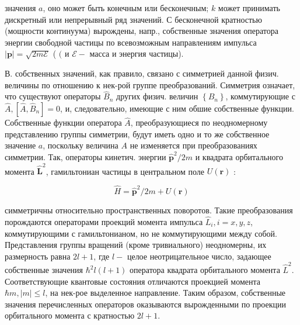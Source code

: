 \documentclass[10pt]{article}
\begin{document}
значения $a$, оно может быть конечным или бесконечным; $k$ может принимать дискретный или непрерывный ряд значений. С бесконечной кратностью (мощности континуума) вырождены, напр., собственные значения оператора энергии свободной частицы по всевозможным направлениям импульса $|\boldsymbol{p}|=\sqrt{2 m \mathscr{E}}$ ( $($ и $\mathscr{E}-$ масса и энергия частицы).



В. собственных значений, как правило, связано с симметрией данной физич. величины по отношению к нек-рой группе преобразований. Симметрия означает, что существуют операторы $\hat{B}_{n}$ других физич. величин $\left\{B_{n}\right\}$, коммутирующие с $\hat{A},\left[\hat{A}, \hat{B}_{n}\right]=0$, и, следовательно, имеющие с ним обшие собственные функции. Собственные функции оператора $\hat{A}$, преобразующиеся по неодномерному представлению группы симметрии, будут иметь одно и то же собственное значение $a$, поскольку величина $A$ не изменяется при преобразованиях симметрии. Так, операторы кинетич. энергии $\hat{\boldsymbol{p}}^{2} / 2 m$ и квадрата орбитального момента $\hat{\boldsymbol{L}}^{2}$, гамильтониан частицы в центральном поле $U(\boldsymbol{r})$ :



\[

\hat{H}=\hat{\boldsymbol{p}}^{2} / 2 m+U(\boldsymbol{r})

\]



симметричны относительно пространственных поворотов. Такие преобразования порождаются операторами проекций момента импульса $\hat{L}_{i}, i=x, y, z$, коммутирующими с гамильтонианом, но не коммутирующими между собой. Представления группы вращений (кроме тривиального) неодномерны, их размерность равна $2 l+1$, где $l-$ целое неотрицательное число, задающее собственные значения $\hbar^{2} l(l+1)$ оператора квадрата орбитального момента $\hat{L}^{2}$. Соответствующие квантовые состояния отличаются проекцией момента $\hbar m,|m| \leqslant l$, на нек-рое выделенное направление. Таким образом, собственные значения перечисленных операторов оказываются вырожденными по проекции орбитального момента с кратностью $2 l+1$.
\end{document}
